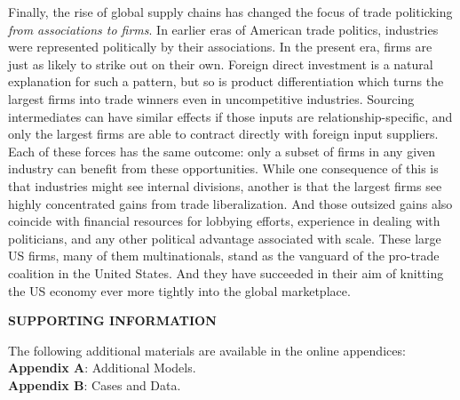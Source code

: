 \documentclass[hidelinks,12pt,letter]{article}
\begin{document}
Finally, the rise of global supply chains has changed the focus of trade politicking \textit{from associations to firms}. In earlier eras of American trade politics, industries were represented politically by their associations. In the present era, firms are just as likely to strike out on their own. Foreign direct investment is a natural explanation for such a pattern, but so is product differentiation which turns the largest firms into trade winners even in uncompetitive industries. Sourcing intermediates can have similar effects if those inputs are relationship-specific, and only the largest firms are able to contract directly with foreign input suppliers. Each of these forces has the same outcome: only a subset of firms in any given industry can benefit from these opportunities. While one consequence of this is that industries might see internal divisions, another is that the largest firms see highly concentrated gains from trade liberalization. And those outsized gains also coincide with financial resources for lobbying efforts, experience in dealing with politicians, and any other political advantage associated with scale. These large US firms, many of them multinationals, stand as the vanguard of the pro-trade coalition in the United States. And they have succeeded in their aim of knitting the US economy ever more tightly into the global marketplace. 



\small
\clearpage



\begin{center}
\textbf{SUPPORTING INFORMATION}
\end{center}
The following additional materials are available in the online appendices:\\
\textbf{Appendix A}: Additional Models.\\
\textbf{Appendix B}: Cases and Data.\\
\end{document}
